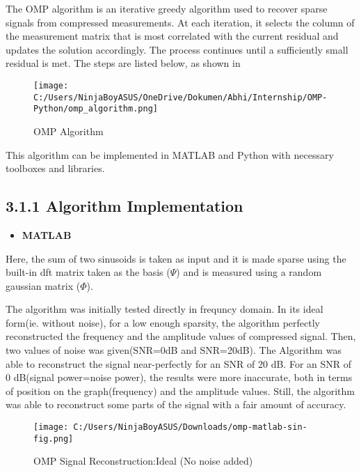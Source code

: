\documentclass[
  letterpaper,
  DIV=11,
  numbers=noendperiod]{scrartcl}
\providecommand{\tightlist}{%
  \setlength{\itemsep}{0pt}\setlength{\parskip}{0pt}}
\begin{document}
The OMP algorithm is an iterative greedy algorithm used to recover
sparse signals from compressed measurements. At each iteration, it
selects the column of the measurement matrix that is most correlated
with the current residual and updates the solution accordingly. The
process continues until a sufficiently small residual is met. The steps
are listed below, as shown in \autocite{omp-intro}

\begin{figure}[H]

{\centering \texttt{[image: C:/Users/NinjaBoyASUS/OneDrive/Dokumen/Abhi/Internship/OMP-Python/omp\_algorithm.png]}

}

\caption{OMP Algorithm}

\end{figure}%

This algorithm can be implemented in MATLAB and Python with necessary
toolboxes and libraries.

\subsection{3.1.1 Algorithm
Implementation}\label{algorithm-implementation}

\begin{itemize}
\tightlist
\item
  \textbf{MATLAB}
\end{itemize}

Here, the sum of two sinusoids is taken as input and it is made sparse
using the built-in dft matrix taken as the basis (\(\Psi\)) and is
measured using a random gaussian matrix (\(\Phi\)).

The algorithm was initially tested directly in frequncy domain. In its
ideal form(ie. without noise), for a low enough sparsity, the algorithm
perfectly reconstructed the frequency and the amplitude values of
compressed signal. Then, two values of noise was given(SNR=0dB and
SNR=20dB). The Algorithm was able to reconstruct the signal
near-perfectly for an SNR of 20 dB. For an SNR of 0 dB(signal
power=noise power), the results were more inaccurate, both in terms of
position on the graph(frequency) and the amplitude values. Still, the
algorithm was able to reconstruct some parts of the signal with a fair
amount of accuracy.

\begin{figure}[H]

{\centering \texttt{[image: C:/Users/NinjaBoyASUS/Downloads/omp-matlab-sin-fig.png]}

}

\caption{OMP Signal Reconstruction:Ideal (No noise added)}

\end{figure}%
\end{document}
